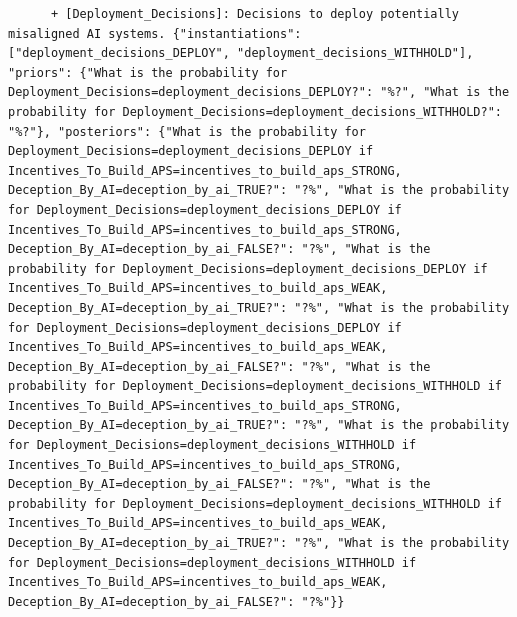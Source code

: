 \documentclass[
  11pt,
  letterpaper,
]{book}
\begin{document}
\begin{verbatim}
      + [Deployment_Decisions]: Decisions to deploy potentially misaligned AI systems. {"instantiations": ["deployment_decisions_DEPLOY", "deployment_decisions_WITHHOLD"], "priors": {"What is the probability for Deployment_Decisions=deployment_decisions_DEPLOY?": "%?", "What is the probability for Deployment_Decisions=deployment_decisions_WITHHOLD?": "%?"}, "posteriors": {"What is the probability for Deployment_Decisions=deployment_decisions_DEPLOY if Incentives_To_Build_APS=incentives_to_build_aps_STRONG, Deception_By_AI=deception_by_ai_TRUE?": "?%", "What is the probability for Deployment_Decisions=deployment_decisions_DEPLOY if Incentives_To_Build_APS=incentives_to_build_aps_STRONG, Deception_By_AI=deception_by_ai_FALSE?": "?%", "What is the probability for Deployment_Decisions=deployment_decisions_DEPLOY if Incentives_To_Build_APS=incentives_to_build_aps_WEAK, Deception_By_AI=deception_by_ai_TRUE?": "?%", "What is the probability for Deployment_Decisions=deployment_decisions_DEPLOY if Incentives_To_Build_APS=incentives_to_build_aps_WEAK, Deception_By_AI=deception_by_ai_FALSE?": "?%", "What is the probability for Deployment_Decisions=deployment_decisions_WITHHOLD if Incentives_To_Build_APS=incentives_to_build_aps_STRONG, Deception_By_AI=deception_by_ai_TRUE?": "?%", "What is the probability for Deployment_Decisions=deployment_decisions_WITHHOLD if Incentives_To_Build_APS=incentives_to_build_aps_STRONG, Deception_By_AI=deception_by_ai_FALSE?": "?%", "What is the probability for Deployment_Decisions=deployment_decisions_WITHHOLD if Incentives_To_Build_APS=incentives_to_build_aps_WEAK, Deception_By_AI=deception_by_ai_TRUE?": "?%", "What is the probability for Deployment_Decisions=deployment_decisions_WITHHOLD if Incentives_To_Build_APS=incentives_to_build_aps_WEAK, Deception_By_AI=deception_by_ai_FALSE?": "?%"}}

\end{verbatim}
\end{document}
